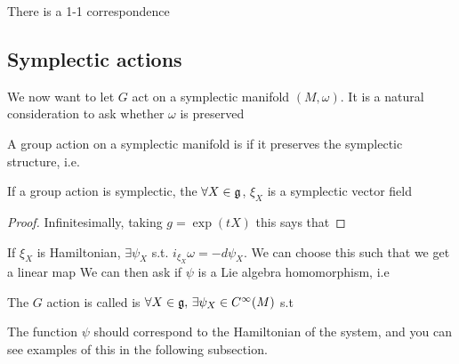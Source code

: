 \documentclass{article}
\begin{document}
\begin{theorem}
There is a 1-1 correspondence
\end{theorem}

\subsection{Symplectic actions}


We now want to let $G$ act on a symplectic manifold $(M,\omega)$. It is a natural consideration to ask whether $\omega$ is preserved

\begin{definition}
A group action on a symplectic manifold is  if it preserves the symplectic structure, i.e.
\end{definition}
\begin{prop}
If a group action is symplectic, the $\forall X \in \mathfrak{g}$, $\xi_X$ is a symplectic vector field
\end{prop}
\begin{proof}
Infinitesimally, taking $g = \exp(tX)$ this says that 
\end{proof}
If $\xi_X$ is Hamiltonian, $\exists \psi_X$ s.t. $i_{\xi_X} \omega = -d\psi_X$. We can choose this such that we get a linear map 
We can then ask if $\psi$ is a Lie algebra homomorphism, i.e 

\begin{definition}
The $G$ action is called  is $\forall X \in \mathfrak{g}, \, \exists \psi_X \in C^\infty(M)$ s.t 
\end{definition}

\begin{remark}
The function $\psi$ should correspond to the Hamiltonian of the system, and you can see examples of this in the following subsection. 
\end{remark}
\end{document}
